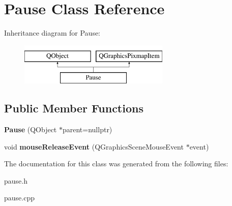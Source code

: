 \hypertarget{classPause}{\section{Pause Class Reference}
\label{classPause}
}
Inheritance diagram for Pause\-:\begin{figure}[H]
\begin{center}
\leavevmode
\includegraphics[height=2.000000cm]{classPause}
\end{center}
\end{figure}
\subsection*{Public Member Functions}
\begin{DoxyCompactItemize}
\item 
\hypertarget{classPause_a619b49e5a34f350da73a02605d982535}{{\bfseries Pause} (Q\-Object $\ast$parent=nullptr)}\label{classPause_a619b49e5a34f350da73a02605d982535}

\item 
\hypertarget{classPause_a1fe1549d3bc13a0868c1cf7458657760}{void {\bfseries mouse\-Release\-Event} (Q\-Graphics\-Scene\-Mouse\-Event $\ast$event)}\label{classPause_a1fe1549d3bc13a0868c1cf7458657760}

\end{DoxyCompactItemize}


The documentation for this class was generated from the following files\-:\begin{DoxyCompactItemize}
\item 
pause.\-h\item 
pause.\-cpp\end{DoxyCompactItemize}
